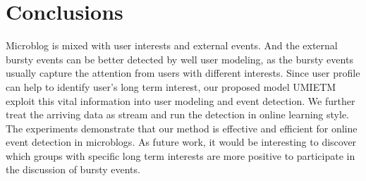 \documentclass[runningheads,a4paper]{llncs}
\begin{document}
\section{Conclusions}
Microblog is mixed with user interests and external events. 
And the external bursty events can be better detected by well user modeling, as the bursty events usually capture the attention from users with different interests.
Since user profile can help to identify user's long term interest, our proposed model UMIETM exploit this vital information into user modeling and event detection.
We further treat the arriving data as stream and run the detection in online learning style.
The experiments demonstrate that our method is effective and efficient for online event detection in microblogs. 
As future work, it would be interesting to discover which groups with specific long term interests are more positive to participate in the discussion of bursty events.



\end{document}
